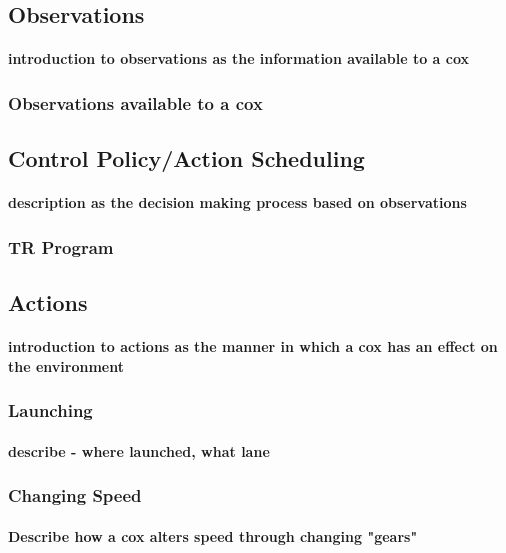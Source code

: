     \subsection{Observations}
      \paragraph{introduction to observations as the information available to a cox}
      
      \subsubsection{Observations available to a cox}
      
    \subsection{Control Policy/Action Scheduling}
      \paragraph{description as the decision making process based on observations}
      \subsubsection{TR Program}
    
    \subsection{Actions}
      \paragraph{introduction to actions as the manner in which a cox has an effect on the environment}
      \subsubsection{Launching}
        \paragraph{describe - where launched, what lane}
      \subsubsection{Changing Speed}
        \paragraph{Describe how a cox alters speed through changing "gears"}
